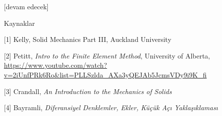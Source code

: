 \documentclass[12pt,fleqn]{article}\usepackage{../../common}
\begin{document}
[devam edecek]

Kaynaklar

[1] Kelly, Solid Mechanics Part III, Auckland University

[2] Petitt, {\em Intro to the Finite Element Method}, University of Alberta,
    \url{https://www.youtube.com/watch?v=2iUnfPRk6Ro&list=PLLSzlda_AXa3yQEJAb5JcmsVDy9i9K_fi}

[3] Crandall, {\em An Introduction to the Mechanics of Solids}

[4] Bayramli, {\em Diferansiyel Denklemler, Ekler, Küçük Açı Yaklaşıklaması}
\end{document}
